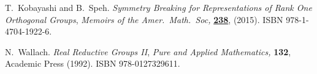\documentclass[reqno,12pt]{pja00} %
\theoremstyle{definition}
\theoremstyle{exampstyle} \newtheorem{examp}[theorem]{Theorem}
\begin{document}
\begin{thebibliography}{14}
T.~Kobayashi and B.~Speh.
\newblock \emph{Symmetry {B}reaking for {R}epresentations of {R}ank {O}ne
  {O}rthogonal {G}roups}, \emph{{\normalfont Memoirs of the Amer.~Math.~Soc},}
  \textbf{\href{http://dx.doi.org/10.1090/memo/1126}{238}}, (2015).
\newblock ISBN 978-1-4704-1922-6.

N.~Wallach.
\newblock \emph{Real Reductive Groups II}, \emph{{\normalfont Pure and Applied
  Mathematics},} \textbf{132},
\newblock Academic {P}ress (1992).
\newblock ISBN 978-0127329611.

\end{thebibliography}
\end{document}
